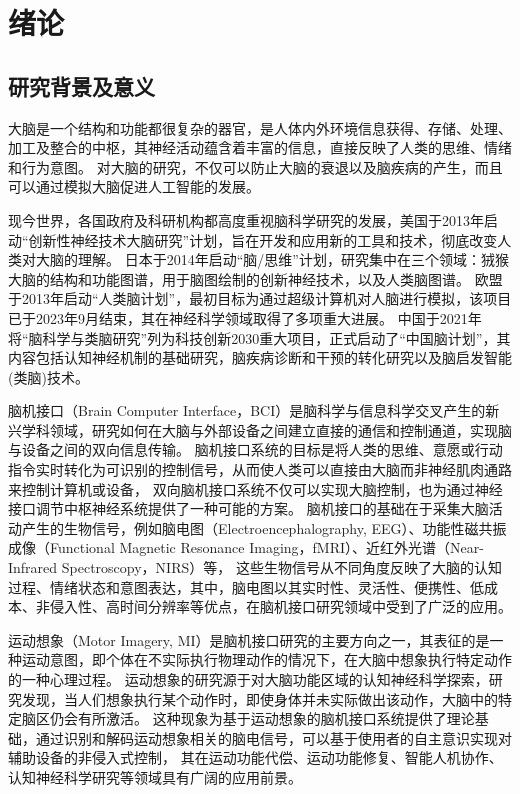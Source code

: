 
\chapter{绪论}

\section{研究背景及意义}

大脑是一个结构和功能都很复杂的器官，是人体内外环境信息获得、存储、处理、加工及整合的中枢\cite{LXTX201902004}，其神经活动蕴含着丰富的信息，直接反映了人类的思维、情绪和行为意图。
对大脑的研究，不仅可以防止大脑的衰退以及脑疾病的产生，而且可以通过模拟大脑促进人工智能的发展\cite{KYYX201907013}。

现今世界，各国政府及科研机构都高度重视脑科学研究的发展，美国于2013年启动“创新性神经技术大脑研究”计划，旨在开发和应用新的工具和技术，彻底改变人类对大脑的理解\cite{jorgenson2015brain}。
日本于2014年启动“脑/思维”计划，研究集中在三个领域：狨猴大脑的结构和功能图谱，用于脑图绘制的创新神经技术，以及人类脑图谱\cite{okano2015brain}。
欧盟于2013年启动“人类脑计划”，最初目标为通过超级计算机对人脑进行模拟，该项目已于2023年9月结束，其在神经科学领域取得了多项重大进展\cite{naddaf2023europe}。
中国于2021年将“脑科学与类脑研究”列为科技创新2030重大项目\cite{china2021brain}，正式启动了“中国脑计划”，其内容包括认知神经机制的基础研究，脑疾病诊断和干预的转化研究以及脑启发智能(类脑)技术\cite{POO2016591}。

脑机接口（Brain Computer Interface，BCI）是脑科学与信息科学交叉产生的新兴学科领域，研究如何在大脑与外部设备之间建立直接的通信和控制通道，实现脑与设备之间的双向信息传输。
脑机接口系统的目标是将人类的思维、意愿或行动指令实时转化为可识别的控制信号，从而使人类可以直接由大脑而非神经肌肉通路来控制计算机或设备，
双向脑机接口系统不仅可以实现大脑控制，也为通过神经接口调节中枢神经系统提供了一种可能的方案\cite{he2020brain}。
脑机接口的基础在于采集大脑活动产生的生物信号，例如脑电图（Electroencephalography, EEG）、功能性磁共振成像（Functional Magnetic Resonance Imaging，fMRI）、近红外光谱（Near-Infrared Spectroscopy，NIRS）等，
这些生物信号从不同角度反映了大脑的认知过程、情绪状态和意图表达，其中，脑电图以其实时性、灵活性、便携性、低成本、非侵入性、高时间分辨率等优点，在脑机接口研究领域中受到了广泛的应用。

运动想象（Motor Imagery, MI）是脑机接口研究的主要方向之一，其表征的是一种运动意图，即个体在不实际执行物理动作的情况下，在大脑中想象执行特定动作的一种心理过程。
运动想象的研究源于对大脑功能区域的认知神经科学探索，研究发现，当人们想象执行某个动作时，即使身体并未实际做出该动作，大脑中的特定脑区仍会有所激活。
这种现象为基于运动想象的脑机接口系统提供了理论基础，通过识别和解码运动想象相关的脑电信号，可以基于使用者的自主意识实现对辅助设备的非侵入式控制，
其在运动功能代偿、运动功能修复\cite{pichiorri2015brain}、智能人机协作、认知神经科学研究等领域具有广阔的应用前景。

